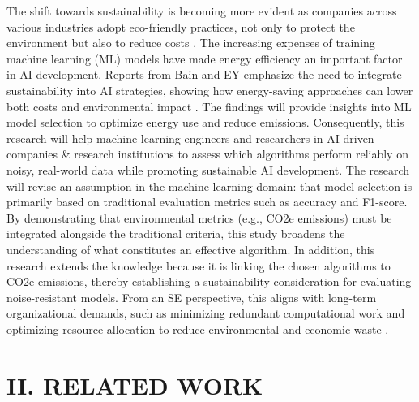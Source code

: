 \documentclass[conference]{IEEEtran}
\begin{document}
\newline
\newline
The shift towards sustainability is becoming more evident as companies across various industries adopt eco-friendly practices, not only to protect the environment but also to reduce costs \cite{ey_ai_sustainability}. The increasing expenses of training machine learning (ML) models have made energy efficiency an important factor in AI development. Reports from Bain and EY emphasize the need to integrate sustainability into AI strategies, showing how energy-saving approaches can lower both costs and environmental impact \cite{bain_ai_sustainability}. 
\newline
\newline
The findings will provide insights into ML model selection to optimize energy use and reduce emissions. Consequently, this research will help machine learning engineers and researchers in AI-driven companies \& research institutions to assess which algorithms perform reliably on noisy, real-world data while promoting sustainable AI development.
\newline
\newline
The research will revise an assumption in the machine learning domain: that model selection is primarily based on traditional evaluation metrics such as accuracy and F1-score. By demonstrating that environmental metrics (e.g., CO2e emissions) must be integrated alongside the traditional criteria, this study broadens the understanding of what constitutes an effective algorithm. In addition, this research extends the knowledge because it is linking the chosen algorithms to CO2e emissions, thereby establishing a sustainability consideration for evaluating noise-resistant models. From an SE perspective, this aligns with long-term organizational demands, such as minimizing redundant computational work and optimizing resource allocation to reduce environmental and economic waste \cite[pp. 290-291]{sweb}.

\section*{II. RELATED WORK}
\end{document}
